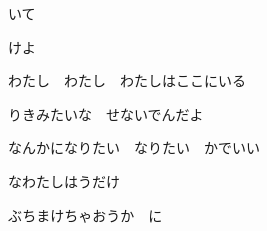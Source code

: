 \documentclass[a4paper,tate,twocolumn,12pt]{ltjtarticle}
\begin{document}
\begin{flushleft}
\begin{minipage}{\linewidth}
いて
\end{minipage}

\vspace{2em}

\noindent\begin{minipage}{\linewidth}
けよ
\end{minipage}

\vspace{2em}

\noindent\begin{minipage}{\linewidth}
わたし　わたし　わたしはここにいる

りきみたいな　せないでんだよ

なんかになりたい　なりたい　かでいい

なわたしはうだけ

ぶちまけちゃおうか　に
\end{minipage}

\end{flushleft}
\end{document}
